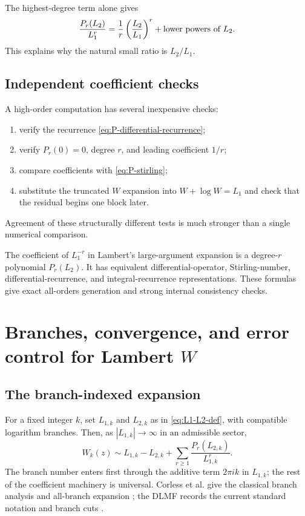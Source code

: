 \documentclass[11pt,oneside]{book}
\theoremstyle{definition}
\theoremstyle{remark}
\begin{document}
The highest-degree term alone gives
\[
 \frac{P_r(L_2)}{L_1^r}
 =\frac1r\left(\frac{L_2}{L_1}\right)^r
 +\hbox{lower powers of }L_2.
\]
This explains why the natural small ratio is $L_2/L_1$.

\section{Independent coefficient checks}
A high-order computation has several inexpensive checks:
\begin{enumerate}
\item verify the recurrence \eqref{eq:P-differential-recurrence};
\item verify $P_r(0)=0$, degree $r$, and leading coefficient $1/r$;
\item compare coefficients with \eqref{eq:P-stirling};
\item substitute the truncated $W$ expansion into $W+\log W=L_1$ and check
      that the residual begins one block later.
\end{enumerate}
Agreement of these structurally different tests is much stronger than a
single numerical comparison.

\begin{summarybox}
The coefficient of $L_1^{-r}$ in Lambert's large-argument expansion is a
degree-$r$ polynomial $P_r(L_2)$.  It has equivalent differential-operator,
Stirling-number, differential-recurrence, and integral-recurrence
representations.  These formulas give exact all-orders generation and strong
internal consistency checks.
\end{summarybox}


\chapter{Branches, convergence, and error control for Lambert \texorpdfstring{$W$}{W}}
\label{ch:lambert-branches}

\section{The branch-indexed expansion}
For a fixed integer $k$, set $L_{1,k}$ and $L_{2,k}$ as in
\eqref{eq:L1-L2-def}, with compatible logarithm branches.  Then, as
$|L_{1,k}|\to\infty$ in an admissible sector,
\begin{equation}\label{eq:Wk-expansion}
 W_k(z)\sim L_{1,k}-L_{2,k}
 +\sum_{r\ge1}\frac{P_r(L_{2,k})}{L_{1,k}^r}.
\end{equation}
The branch number enters first through the additive term $2\pi i k$ in
$L_{1,k}$; the rest of the coefficient machinery is universal.  Corless et
al. give the classical branch analysis and all-branch expansion
\cite{Corless1996}; the DLMF records the current standard notation and branch
cuts \cite{DLMF413}.
\end{document}
